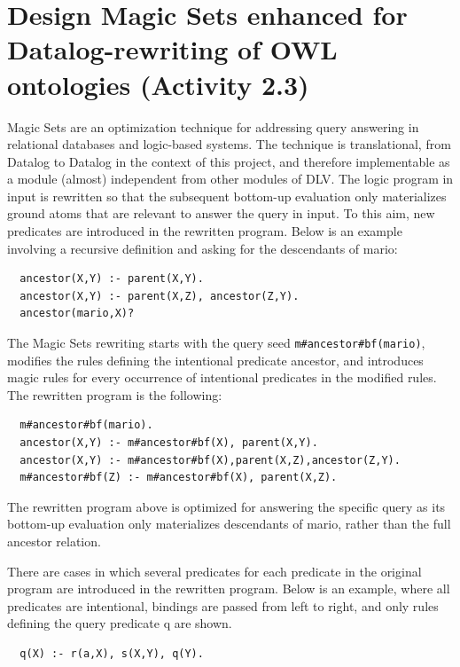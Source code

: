 \documentclass[oneside]{book}
\begin{document}
\section{Design Magic Sets enhanced for Datalog-rewriting of OWL ontologies (Activity 2.3)}
Magic Sets are an optimization technique for addressing query answering in relational databases and logic-based systems. The technique is translational, from Datalog to Datalog in the context of this project, and therefore implementable as a module (almost) independent from other modules of DLV. The logic program in input is rewritten so that the subsequent bottom-up evaluation only materializes ground atoms that are relevant to answer the query in input. To this aim, new predicates are introduced in the rewritten program. Below is an example involving a recursive definition and asking for the descendants of mario:
\begin{verbatim}
  ancestor(X,Y) :- parent(X,Y).
  ancestor(X,Y) :- parent(X,Z), ancestor(Z,Y).
  ancestor(mario,X)?
\end{verbatim}

The Magic Sets rewriting starts with the query seed {\tt m\#ancestor\#bf(mario)}, modifies the rules defining the intentional predicate ancestor, and introduces magic rules for every occurrence of intentional predicates in the modified rules. The rewritten program is the following:
\begin{verbatim}
  m#ancestor#bf(mario).
  ancestor(X,Y) :- m#ancestor#bf(X), parent(X,Y).
  ancestor(X,Y) :- m#ancestor#bf(X),parent(X,Z),ancestor(Z,Y).
  m#ancestor#bf(Z) :- m#ancestor#bf(X), parent(X,Z).
\end{verbatim}

The rewritten program above is optimized for answering the specific query as its bottom-up evaluation only materializes descendants of mario, rather than the full ancestor relation.

There are cases in which several predicates for each predicate in the original program are introduced in the rewritten program. Below is an example, where all predicates are intentional, bindings are passed from left to right, and only rules defining the query predicate q are shown.
\begin{verbatim}
  q(X) :- r(a,X), s(X,Y), q(Y).
\end{verbatim}
\end{document}

